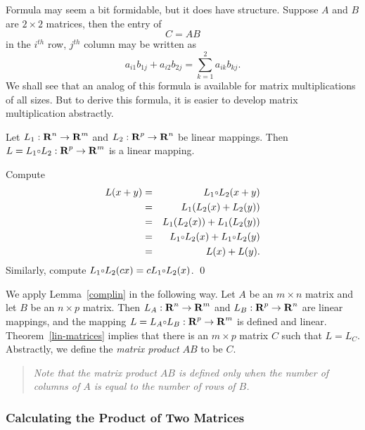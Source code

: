 Formula  may seem a bit formidable, but it does
have structure.  Suppose $A$ and $B$ are $2\times 2$ matrices,
then the entry of
\[
C=AB
\]
in the $i^{th}$ row, $j^{th}$ column may be written as
\[
a_{i1}b_{1j} + a_{i2}b_{2j} = \sum_{k=1}^2 a_{ik}b_{kj}.
\]
We shall see that an analog of this formula is available for
matrix multiplications of all sizes.  But to derive this
formula, it is easier to develop matrix multiplication
abstractly.


\begin{lemma}  \label{complin}
Let $L_1:\mbox{$\bf{R}$}^n\to\mbox{$\bf{R}$}^m$ and $L_2:\mbox{$\bf{R}$}^p\to\mbox{$\bf{R}$}^n$ be linear mappings.
Then $L=L_1\compose L_2:\R^p\to\R^m$ is a linear mapping.
\end{lemma}

\proof  Compute
\begin{eqnarray*}
L(x+y) & = & L_1\compose L_2(x+y)\\
 & = & L_1(L_2(x)+L_2(y)) \\
 & = & L_1(L_2(x)) + L_1(L_2(y))\\
 & = & L_1\compose L_2(x) + L_1\compose L_2(y)\\
 & = & L(x) + L(y).
\end{eqnarray*}
Similarly, compute $L_1\compose L_2(cx) = cL_1\compose L_2(x)$.
\qed

We apply Lemma~\ref{complin} in the following way.  Let $A$ be
an $m\times n$ matrix and let $B$ be an $n\times p$
matrix.  Then $L_A:\mbox{$\bf{R}$}^n\to\mbox{$\bf{R}$}^m$ and $L_B:\mbox{$\bf{R}$}^p\to\mbox{$\bf{R}$}^n$ are linear
mappings, and the mapping $L=L_A\compose L_B:\R^p\to\R^m$ is
defined and linear.  Theorem~\ref{lin-matrices} implies that
there is an $m\times p$ matrix $C$ such that $L=L_C$.
Abstractly, we define the {\em matrix product\/} 
$AB$ to be $C$.
\begin{quote}
{\em Note that the matrix product $AB$ is defined only when the number of
columns of $A$ is equal to the number of rows of $B$.}
\end{quote}

\subsubsection*{Calculating the Product of Two Matrices}

